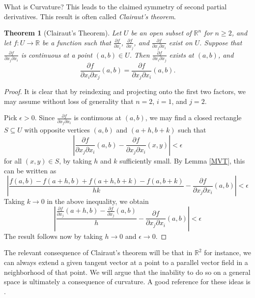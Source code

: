 \documentclass{article}
\numberwithin{equation}{subsection}
\newtheorem{theorem}{Theorem}[subsection]
\theoremstyle{definition}
\begin{document}
\begin{section}{What is Curvature?}
This leads to the claimed symmetry of second partial derivatives. This result is often called \textit{Clairaut's theorem}.

\begin{theorem}[Clairaut's Theorem]
Let $U$ be an open subset of $\mathbb{R}^n$ for $n\geq2$, and let $f\colon U\to\mathbb{R}$ be a function such that $\frac{\partial f}{\partial x_i}$, $\frac{\partial f}{\partial x_j}$, and $\frac{\partial f}{\partial x_j\partial x_i}$ exist on $U$. Suppose that $\frac{\partial f}{\partial x_j\partial x_i}$ is continuous at a point $(a,b)\in U$. Then $\frac{\partial f}{\partial x_i\partial x_j}$ exists at $(a,b)$, and
\begin{equation}
\frac{\partial f}{\partial x_i\partial x_j}(a,b)=\frac{\partial f}{\partial x_j\partial x_i}(a,b).
\end{equation}
\end{theorem}

\begin{proof}
It is clear that by reindexing and projecting onto the first two factors, we may assume without loss of generality that $n=2$, $i=1$, and $j=2$.

Pick $\epsilon>0$. Since $\frac{\partial f}{\partial x_j\partial x_i}$ is continuous at $(a,b)$, we may find a closed rectangle $S\subseteq U$ with opposite vertices $(a,b)$ and $(a+h,b+k)$ such that
\begin{equation}
\left|\frac{\partial f}{\partial x_j\partial x_i}(a,b)-\frac{\partial f}{\partial x_j\partial x_i}(x,y)\right|<\epsilon
\end{equation}
for all $(x,y)\in S$, by taking $h$ and $k$ sufficiently small. By Lemma \ref{MVT}, this can be written as
\begin{equation}
\left|\frac{f(a,b)-f(a+h,b)+f(a+h,b+k)-f(a,b+k)}{hk}-\frac{\partial f}{\partial x_j\partial x_i}(a,b)\right|<\epsilon
\end{equation}
Taking $k\to0$ in the above inequality, we obtain
\begin{equation}
\left|\frac{\frac{\partial f}{\partial x_j}(a+h,b)-\frac{\partial f}{\partial x_j}(a,b)}{h}-\frac{\partial f}{\partial x_j\partial x_i}(a,b)\right|<\epsilon
\end{equation}
The result follows now by taking $h\to0$ and $\epsilon\to0$.
\end{proof}

The relevant consequence of Clairaut's theorem will be that in $\mathbb{R}^2$ for instance, we can always extend a given tangent vector at a point to a parallel vector field in a neighborhood of that point. We will argue that the inability to do so on a general space is ultimately a consequence of curvature. A good reference for these ideas is \cite{Lee}.


\end{section}
\end{document}
